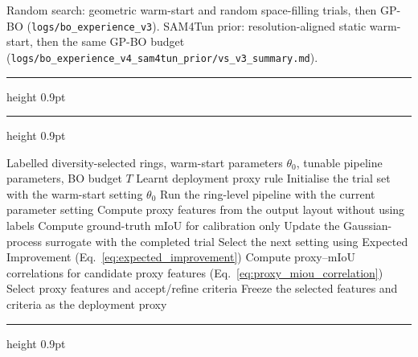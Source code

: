 \documentclass[a4paper,fleqn]{cas-dc}
\begin{document}
{\begin{table}[t]
{\footnotesize Random search: geometric warm-start and random space-filling trials, then GP-BO (\texttt{logs/bo\_experience\_v3}). SAM4Tun prior: resolution-aligned static warm-start, then the same GP-BO budget (\texttt{logs/bo\_experience\_v4\_sam4tun\_prior/vs\_v3\_summary.md}).}
\end{table}

\FloatBarrier %
\clearpage %

\begin{samepage}

\begin{center}
\begin{minipage}{\textwidth}
\captionsetup{type=algorithm, labelfont=bf, font=small}
\hrule height 0.9pt\vspace{0.2em}
\label{alg:design_time_proxy_calibration}
\vspace{0.2em}\hrule height 0.9pt\vspace{0.35em}
\begin{algorithmic}[1]
\Require Labelled diversity-selected rings, warm-start parameters $\theta_0$, tunable pipeline parameters, BO budget $T$
\Ensure Learnt deployment proxy rule
\State Initialise the trial set with the warm-start setting $\theta_0$
    \State Run the ring-level pipeline with the current parameter setting
    \State Compute proxy features from the output layout without using labels
    \State Compute ground-truth mIoU for calibration only
    \State Update the Gaussian-process surrogate with the completed trial
    \State Select the next setting using Expected Improvement (Eq.~\ref{eq:expected_improvement})
\EndFor
\State Compute proxy--mIoU correlations for candidate proxy features (Eq.~\ref{eq:proxy_miou_correlation})
\State Select proxy features and accept/refine criteria
\State Freeze the selected features and criteria as the deployment proxy
\end{algorithmic}
\vspace{0.1em}\hrule height 0.9pt
\end{minipage}
\end{center}


\end{samepage}}
\end{document}
